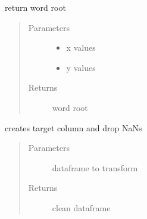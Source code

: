 \documentclass[letterpaper,10pt,english]{sphinxmanual}
\begin{document}

\begin{fulllineitems}
\label{\detokenize{algorithms:algorithms.ira.ira_trainer.__do_stemmer}}
\sphinxAtStartPar
return word root
\begin{quote}\begin{description}
\item[{Parameters}] \leavevmode\begin{itemize}
\item {} 
\sphinxAtStartPar
{} \textendash{} x values

\item {} 
\sphinxAtStartPar
{} \textendash{} y values

\end{itemize}

\item[{Returns}] \leavevmode
\sphinxAtStartPar
word root

\end{description}\end{quote}

\end{fulllineitems}


\begin{fulllineitems}
\label{\detokenize{algorithms:algorithms.ira.ira_trainer.__transform_df}}
\sphinxAtStartPar
creates target column and drop NaNs
\begin{quote}\begin{description}
\item[{Parameters}] \leavevmode
\sphinxAtStartPar
{} \textendash{} dataframe to transform

\item[{Returns}] \leavevmode
\sphinxAtStartPar
clean dataframe

\end{description}\end{quote}

\end{fulllineitems}
\end{document}
